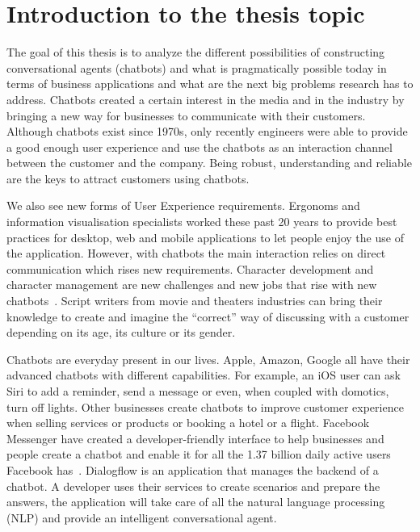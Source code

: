 
\chapter{Introduction to the thesis topic} %

\label{Chapter1} %

The goal of this thesis is to analyze the different possibilities of constructing conversational agents (chatbots) and what is pragmatically possible today in terms of business applications and what are the next big problems research has to address. Chatbots created a certain interest in the media and in the industry by bringing a new way for businesses to communicate with their customers. Although chatbots exist since 1970s, only recently engineers were able to provide a good enough user experience and use the chatbots as an interaction channel between the customer and the company. Being robust, understanding and reliable are the keys to attract customers using chatbots.

We also see new forms of User Experience requirements. Ergonoms and information visualisation specialists worked these past 20 years to provide best practices for desktop, web and mobile applications to let people enjoy the use of the application. However, with chatbots the main interaction relies on direct communication which rises new requirements.
Character development and character management are new challenges and new jobs that rise with new chatbots~\citep{1704.04579}.
Script writers from movie and theaters industries can bring their knowledge to create and imagine the ``correct'' way of discussing with a customer depending on its age, its culture or its gender.


Chatbots are everyday present in our lives. Apple, Amazon, Google all have their advanced chatbots with different capabilities. For example, an iOS user can ask Siri to add a reminder, send a message or even, when coupled with domotics, turn off lights. Other businesses create chatbots to improve customer experience when selling services or products or booking a hotel or a flight. Facebook Messenger have created a developer-friendly interface to help businesses and people create a chatbot and enable it for all the 1.37 billion daily active users Facebook has~\citep{facebook3rdquarter2017}. Dialogflow is an application that manages the backend of a chatbot. A developer uses their services to create scenarios and prepare the answers, the application will take care of all the natural language processing (NLP) and provide an intelligent conversational agent.

